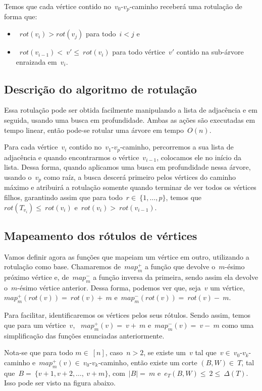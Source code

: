\documentclass[a4paper,12pt]{article}
\begin{document}
	Temos que cada vértice contido no~$v_0$-$v_p$-caminho receberá uma 
	rotulação de forma que:
	\begin{itemize}
		\item~$rot(v_i)>rot(v_j)$ para todo~$i<j$ e
		\item~$rot(v_{i-1})<~v' \le~rot(v_i)$ para todo vértice~$v'$ contido 
		na sub-árvore enraizada em~$v_i$. 
	\end{itemize}

	\bigskip
	\bigskip

	\subsection{Descrição do algoritmo de rotulação}
	Essa rotulação pode ser obtida facilmente 
	manipulando a lista de adjacência e em seguida,
	usando uma busca em profundidade.
	Ambas as ações são executadas em tempo linear, então
	pode-se rotular uma árvore em tempo~$O(n)$.

	Para cada vértice~$v_i$ contido no~$v_1$-$v_{p}$-caminho, percorremos
	a sua lista de adjacência e quando encontrarmos o 
	vértice~$v_{i-1}$, colocamos ele no início da lista.
	Dessa forma, quando aplicamos uma busca em profundidade
	nessa árvore, usando o~$v_p$ como raíz, a busca descerá primeiro
	pelos vértices do caminho máximo e atribuirá a rotulação
	somente quando terminar de ver todos os vértices filhos, garantindo
	assim que para todo~$r\in~\{1,\ldots, p\}$, temos 
	que~$rot(T_{v_i})\le~rot(v_i)$ e~$rot(v_i)>~rot(v_{i-1})$.
	
	\bigskip
	\bigskip

	\subsection{Mapeamento dos rótulos de vértices }
	Vamos definir agora as funções que mapeiam um vértice em 
	outro, utilizando a rotulação como base.
	Chamaremos de~$map^+_m$
	a função que devolve o~$m$-ésimo próximo vértice e,
	de~$map^-_m$ a função inversa da primeira, sendo assim
	ela devolve o~$m$-ésimo vértice anterior.
	Dessa forma, podemos ver que, seja~$v$ um 
	vértice, ~$map^+_m(rot(v)) =~rot(v)+~m$ 
	e~$map^-_m(rot(v)) =~rot(v)-~m$.

	Para facilitar, identificaremos os vértices pelos
	seus rótulos. Sendo assim, temos 
	que para um vértice~$v$, ~$map^+_m(v) =~v+~m$ 
	e~$map^-_m(v) =~v-~m$ como uma simplificação das funções
	enunciadas anteriormente.

	Nota-se que para todo $m\in~[n]$, caso~$n>2$, se existe 
	um~$v$ tal 
	que~$v\in~v_0$-$v_k$-caminho 
	e~$map^+_m(v)\in~v_0$-$v_k$-caminho, então 
	existe um corte $(B,W)\in~T$, tal 
	que~$B =~\{v+1, v+2,\ldots,~v+m\}$, com~$|B|=~m$
	e~$e_T(B,W)\le~2\le~\Delta(T)$.
	Isso pode ser visto na figura abaixo.
\end{document}
